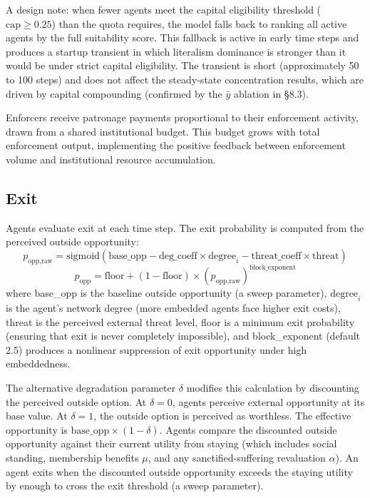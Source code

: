 \documentclass[12pt]{article}
\begin{document}
A design note: when fewer agents meet the capital eligibility threshold ($\text{cap} \geq 0.25$) than the quota requires, the model falls back to ranking all active agents by the full suitability score. This fallback is active in early time steps and produces a startup transient in which literalism dominance is stronger than it would be under strict capital eligibility. The transient is short (approximately 50 to 100 steps) and does not affect the steady-state concentration results, which are driven by capital compounding (confirmed by the $\bar{y}$ ablation in \S8.3).

Enforcers receive patronage payments proportional to their enforcement activity, drawn from a shared institutional budget. This budget grows with total enforcement output, implementing the positive feedback between enforcement volume and institutional resource accumulation.

\subsection{Exit}

Agents evaluate exit at each time step. The exit probability is computed from the perceived outside opportunity:
\[
p_{\text{opp,raw}} = \text{sigmoid}(\text{base\_opp} - \text{deg\_coeff} \times \text{degree}_i - \text{threat\_coeff} \times \text{threat})
\]
\[
p_{\text{opp}} = \text{floor} + (1 - \text{floor}) \times (p_{\text{opp,raw}})^{\text{block\_exponent}}
\]
where base\_opp is the baseline outside opportunity (a sweep parameter), $\text{degree}_i$ is the agent's network degree (more embedded agents face higher exit costs), threat is the perceived external threat level, floor is a minimum exit probability (ensuring that exit is never completely impossible), and block\_exponent (default 2.5) produces a nonlinear suppression of exit opportunity under high embeddedness.

The alternative degradation parameter $\delta$ modifies this calculation by discounting the perceived outside option. At $\delta = 0$, agents perceive external opportunity at its base value. At $\delta = 1$, the outside option is perceived as worthless. The effective opportunity is $\text{base\_opp} \times (1 - \delta)$. Agents compare the discounted outside opportunity against their current utility from staying (which includes social standing, membership benefits $\mu$, and any sanctified-suffering revaluation $\alpha$). An agent exits when the discounted outside opportunity exceeds the staying utility by enough to cross the exit threshold (a sweep parameter).
\end{document}
